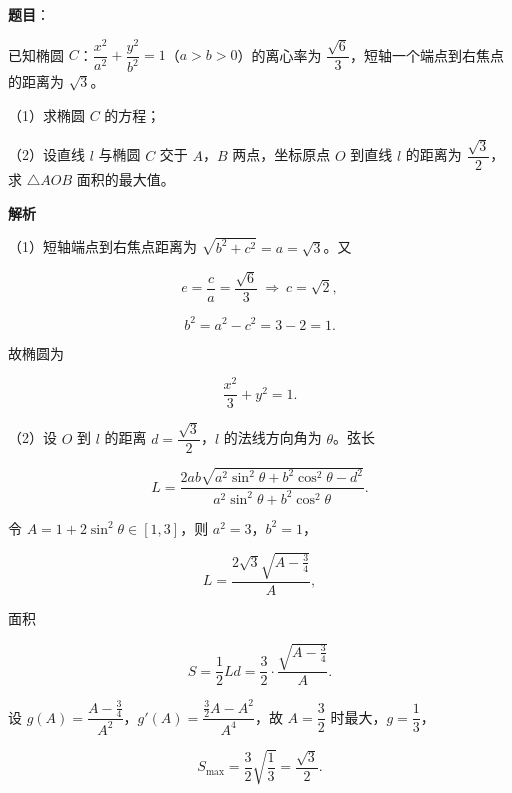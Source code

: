 \begin{answer}

\textbf{题目}：

已知椭圆 $C$：$\dfrac{x^2}{a^2}+\dfrac{y^2}{b^2}=1$（$a>b>0$）的离心率为 $\dfrac{\sqrt6}{3}$，短轴一个端点到右焦点的距离为 $\sqrt3$。

（1）求椭圆 $C$ 的方程；

（2）设直线 $l$ 与椭圆 $C$ 交于 $A$，$B$ 两点，坐标原点 $O$ 到直线 $l$ 的距离为 $\dfrac{\sqrt3}{2}$，求 $\triangle AOB$ 面积的最大值。

\textbf{解析}

（1）短轴端点到右焦点距离为 $\sqrt{b^2+c^2}=a=\sqrt3$。又

\nopagebreak[4]
\[e=\frac ca=\frac{\sqrt6}{3}\ \Rightarrow\ c=\sqrt2,\]

\nopagebreak[4]
\[b^2=a^2-c^2=3-2=1.\]

故椭圆为

\nopagebreak[4]
\[\frac{x^2}{3}+y^2=1.\]

（2）设 $O$ 到 $l$ 的距离 $d=\dfrac{\sqrt3}{2}$，$l$ 的法线方向角为 $\theta$。弦长

\nopagebreak[4]
\[L=\frac{2ab\sqrt{a^2\sin^2\theta+b^2\cos^2\theta-d^2}}{a^2\sin^2\theta+b^2\cos^2\theta}.\]

令 $A=1+2\sin^2\theta\in[1,3]$，则 $a^2=3$，$b^2=1$，

\nopagebreak[4]
\[L=\frac{2\sqrt3\sqrt{A-\frac34}}{A},\]

面积

\nopagebreak[4]
\[S=\frac12Ld=\frac32\cdot\frac{\sqrt{A-\frac34}}A.\]

设 $g(A)=\dfrac{A-\frac34}{A^2}$，$g'(A)=\dfrac{\frac32A-A^2}{A^4}$，故 $A=\dfrac32$ 时最大，$g=\dfrac13$，

\nopagebreak[4]
\[S_{\max}=\frac32\sqrt{\frac13}=\frac{\sqrt3}{2}.\]


\end{answer}
